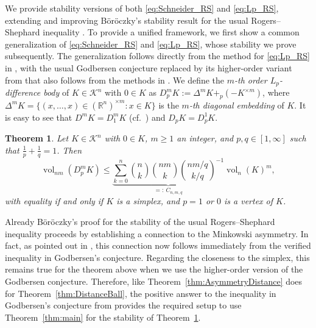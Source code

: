 \documentclass{amsart}
\newtheorem{theorem}{Theorem}[section]
\newcommand{\cemph}[1]{\emph{\color{red}#1}}
\newcommand\R{\mathbb{R}}
\newcommand\CK{\mathcal{K}}
\DeclareMathOperator{\vol}{vol}
\newcommand{\diff}[3]{D_{#1}^{#2} #3}
\newcommand{\diag}[2]{\Delta^{#1} #2}
\newcommand{\cartesian}[2]{#1^{\times #2}}
\begin{document}
We provide stability versions of both \eqref{eq:Schneider_RS} and \eqref{eq:Lp_RS}, extending and improving Böröczky's stability result for the usual Rogers--Shephard inequality \cite{2005:Böröczky}.
To provide a unified framework, we first show a common generalization of \eqref{eq:Schneider_RS} and \eqref{eq:Lp_RS},
whose stability we prove subsequently.
The generalization follows directly from the method for \eqref{eq:Lp_RS} in \cite{2026:KotrbatyMouamine}, with the usual Godbersen conjecture replaced by its higher-order variant from \cite{2025:Kotrbaty} that also follows from the methods in \cite{2026:KotrbatyMouamine}.
We define the \cemph{$m$-th order $L_p$-difference body} of $K \in \CK^n$ with $0 \in K$ as $\diff{p}{m}{K} := \diag{m}{K} +_p (-\cartesian{K}{m})$, where $\diag{m}{K} = \{ (x, \dots, x) \in \cartesian{(\R^n)}{m} : x \in K \}$ is the \cemph{$m$-th diagonal embedding} of $K$.
It is easy to see that $D^m K = \diff{1}{m}{K}$ (cf.~\cite[Proposition~$3.1$]{2025:Kotrbaty}) and $D_p K = \diff{p}{1}{K}$.



\begin{theorem}\label{thm:Lp_RSS}
Let $K \in \CK^n$ with $0 \in K$, $m \geq 1$ an integer, and $p,q \in [1,\infty]$
such that $\frac{1}{p} + \frac{1}{q} = 1$.
Then
\[
    \vol_{nm}(\diff{p}{m}{K})
    \leq \underbrace{\sum_{k = 0}^n \binom{n}{k} \binom{nm}{k} \binom{nm/q}{k/q}^{-1}}_{=:~C_{n,m,q}} \vol_n(K)^m,
\]
with equality if and only if $K$ is a simplex, and $p = 1$ or $0$ is a vertex of $K$.
\end{theorem}



Already Böröczky's proof for the stability of the usual Rogers--Shephard inequality \cite{2005:Böröczky} proceeds by establishing a connection to the Minkowski asymmetry.
In fact, as pointed out in \cite{2005:Böröczky,2026:KotrbatyMouamine}, this connection now follows immediately from the verified inequality in Godbersen's conjecture.
Regarding the closeness to the simplex, this remains true for the theorem above when we use the higher-order version of the Godbersen conjecture.
Therefore, like Theorem~\ref{thm:AsymmetryDistance} does for Theorem~\ref{thm:DistanceBall}, the positive answer to the inequality in Godbersen's conjecture from \cite{2026:KotrbatyMouamine} provides the required setup to use Theorem~\ref{thm:main} for the stability of Theorem~\ref{thm:Lp_RSS}.
\end{document}
